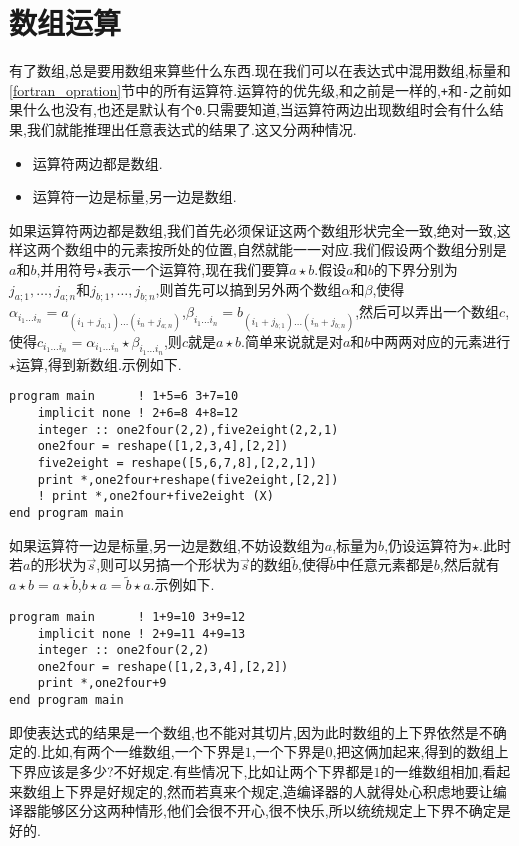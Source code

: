 \section{数组运算}

有了数组,总是要用数组来算些什么东西.现在我们可以在表达式中混用数组,标量和\ref{fortran_opration}节中的所有运算符.运算符的优先级,和之前是一样的,\texttt{+}和\texttt{-}之前如果什么也没有,也还是默认有个\texttt{0}.只需要知道,当运算符两边出现数组时会有什么结果,我们就能推理出任意表达式的结果了.这又分两种情况.
\begin{itemize}
\item 运算符两边都是数组.
\item 运算符一边是标量,另一边是数组.
\end{itemize}

如果运算符两边都是数组,我们首先必须保证这两个数组形状完全一致,绝对一致,这样这两个数组中的元素按所处的位置,自然就能一一对应.我们假设两个数组分别是$a$和$b$,并用符号$\star$表示一个运算符,现在我们要算$a\star b$.假设$a$和$b$的下界分别为$j_{a;1},\dots,j_{a;n}$和$j_{b;1},\dots,j_{b;n}$,则首先可以搞到另外两个数组$\alpha$和$\beta$,使得$\alpha_{i_1\dots i_n}=a_{(i_1+j_{a;1})\dots(i_n+j_{a;n})}$,$\beta_{i_1\dots i_n}=b_{(i_1+j_{b;1})\dots(i_n+j_{b;n})}$,然后可以弄出一个数组$c$,使得$c_{i_1\dots i_n}=\alpha_{i_1\dots i_n}\star\beta_{i_1\dots i_n}$,则$c$就是$a\star b$.简单来说就是对$a$和$b$中两两对应的元素进行$\star$运算,得到新数组.示例如下.
\begin{lstlisting}
program main      ! 1+5=6 3+7=10
    implicit none ! 2+6=8 4+8=12
    integer :: one2four(2,2),five2eight(2,2,1)
    one2four = reshape([1,2,3,4],[2,2])
    five2eight = reshape([5,6,7,8],[2,2,1])
    print *,one2four+reshape(five2eight,[2,2])
    ! print *,one2four+five2eight (X)
end program main
\end{lstlisting}

如果运算符一边是标量,另一边是数组,不妨设数组为$a$,标量为$b$,仍设运算符为$\star$.此时若$a$的形状为$\vec{s}$,则可以另搞一个形状为$\vec{s}$的数组$\tilde{b}$,使得$\tilde{b}$中任意元素都是$b$,然后就有$a\star b=a\star\tilde{b}$,$b\star a=\tilde{b}\star a$.示例如下.
\begin{lstlisting}
program main      ! 1+9=10 3+9=12
    implicit none ! 2+9=11 4+9=13
    integer :: one2four(2,2)
    one2four = reshape([1,2,3,4],[2,2])
    print *,one2four+9
end program main
\end{lstlisting}

即使表达式的结果是一个数组,也不能对其切片,因为此时数组的上下界依然是不确定的.比如,有两个一维数组,一个下界是$1$,一个下界是$0$,把这俩加起来,得到的数组上下界应该是多少?不好规定.有些情况下,比如让两个下界都是$1$的一维数组相加,看起来数组上下界是好规定的,然而若真来个规定,造编译器的人就得处心积虑地要让编译器能够区分这两种情形,他们会很不开心,很不快乐,所以统统规定上下界不确定是好的.

